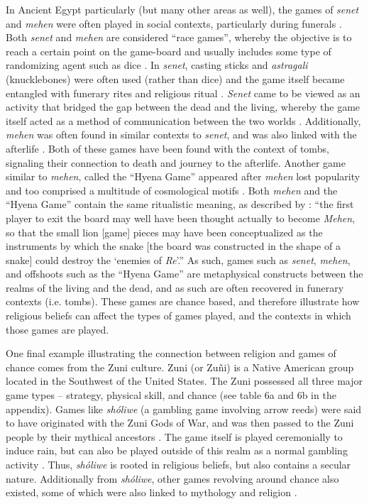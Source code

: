 In Ancient Egypt particularly (but many other areas as well), the games of \textit{senet} and \textit{mehen} were often played in social contexts, particularly during funerals \parencite[34]{kendall2007}. Both \textit{senet} and \textit{mehen} are considered ``race games”, whereby the objective is to reach a certain point on the game-board and usually includes some type of randomizing agent such as dice \parencite[3]{gobet2004}. In \textit{senet}, casting sticks and \textit{astragali} (knucklebones) were often used (rather than dice) and the game itself became entangled with funerary rites and religious ritual \parencites{piccione1980}[58]{piccione2007}. \textit{Senet} came to be viewed as an activity that bridged the gap between the dead and the living, whereby the game itself acted as a method of communication between the two worlds \parencites[59]{piccione2007}{robinson2015}. Additionally, \textit{mehen} was often found in similar contexts to \textit{senet}, and was also linked with the afterlife \parencite[40-41]{kendall2007}. Both of these games have been found with the context of tombs, signaling their connection to death and journey to the afterlife. Another game similar to \textit{mehen}, called the ``Hyena Game” appeared after \textit{mehen} lost popularity and too comprised a multitude of cosmological motifs \parencite[44]{kendall2007}. Both \textit{mehen} and the ``Hyena Game” contain the same ritualistic meaning, as described by \textcite[44]{kendall2007}: ``the first player to exit the board may well have been thought actually to become \textit{Mehen}, so that the small lion [game] pieces may have been conceptualized as the instruments by which the snake [the board was constructed in the shape of a snake] could destroy the ‘enemies of \textit{Re}’.” As such, games such as \textit{senet}, \textit{mehen}, and offshoots such as the ``Hyena Game” are metaphysical constructs between the realms of the living and the dead, and as such are often recovered in funerary contexts (i.e. tombs). These games are chance based, and therefore illustrate how religious beliefs can affect the types of games played, and the contexts in which those games are played. 

One final example illustrating the connection between religion and games of chance comes from the Zuni culture. Zuni (or Zu\~{n}i) is a Native American group located in the Southwest of the United States. The Zuni possessed all three major game types – strategy, physical skill, and chance (see  table 6a and 6b in the appendix). 
Games like \textit{sh\'{o}liwe} (a gambling game involving arrow reeds) were said to have originated with the Zuni Gods of War, and was then passed to the Zuni people by their mythical ancestors \parencite[480]{stevenson1903}. The game itself is played ceremonially to induce rain, but can also be played outside of this realm as a normal gambling activity \parencite[480]{stevenson1903}. Thus, \textit{sh\'{o}liwe} is rooted in religious beliefs, but also contains a secular nature. Additionally from \textit{sh\'{o}liwe}, other games revolving around chance also existed, some of which were also linked to mythology and religion \parencite{stevenson1903}. 

